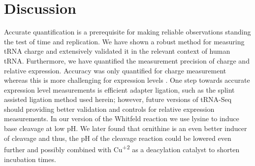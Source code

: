 \documentclass[9pt,lineno]{elife}
\begin{document}
\begin{figure}[ht!]
\label{figsupp:f6S2}
\end{figure}






\section{Discussion}
Accurate quantification is a prerequisite for making reliable observations standing the test of time and replication.
We have shown a robust method for measuring tRNA charge and extensively validated it in the relevant context of human tRNA.
Furthermore, we have quantified the measurement precision of charge and relative expression.
Accuracy was only quantified for charge measurement whereas this is more challenging for expression levels \citep{Fuchs2015-nb}.
One step towards accurate expression level measurements is efficient adapter ligation, such as the splint assisted ligation method used herein; however, future versions of tRNA-Seq should providing better validation and controls for relative expression measurements.
In our version of the Whitfeld reaction we use lysine to induce base cleavage at low pH.
We later found that ornithine is an even better inducer of cleavage \citep{Uziel1975-ja} and thus, the pH of the cleavage reaction could be lowered even further and possibly combined with Cu\textsuperscript{+2} as a deacylation catalyst \citep{Kroll1952-ci, Schofield1968-qn} to shorten incubation times.
\end{document}
